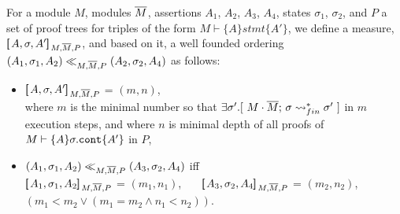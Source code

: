 \begin{definition}
For a module $M$, modules $\overline{M}$, assertions $A_1$, $A_2$, $A_3$, $A_4$, states $\sigma_1$, $\sigma_2$, and   $P$ a set of proof trees for triples of the form 
$M \vdash \{ A \} stmt  \{ A' \} $,  we define a measure, $[\!\![\, A, \sigma,A' ]\!\!]\,_{M,\overline{M},P} $, and based on it, a well founded ordering $(A_1,\sigma_1,A_2) \ll_{M,\overline{M},P}  (A_2,\sigma_2,A_4)$
as follows:
\begin{itemize}
\item
 $[\!\![\, A, \sigma,A' ]\!\!]\,_{M,\overline{M},P} $ = $(m, n)$, \\
 where $m$ is the minimal number so that $\exists \sigma'.[\ \leadstoBoundedStarFin {M\cdot \Mtwo} {\sigma}    {\sigma'}\ ]$ in $m$ execution steps, and where $n$ is minimal depth of all proofs of $M \vdash \{ A \} \sigma.\mbox{\normalfont{\texttt{cont}}}  \{ A' \} $ in $P$,
\item
$(A_1,\sigma_1,A_2) \ll_{M,\overline{M},P}  (A_3,\sigma_2,A_4)$ iff
\\
$[\!\![\, A_1, \sigma_1,A_2 ]\!\!]\,_{M,\overline{M},P} $ = $(m_1, n_1)$, \ \   \ $[\!\![\, A_3, \sigma_2,A_4 ]\!\!]\,_{M,\overline{M},P} $ = $(m_2, n_2)$, \ \ \  $(m_1<m_2 \vee  (m_1=m_2  \wedge  n_1 < n_2))$.
\end{itemize}
\end{definition}

%

